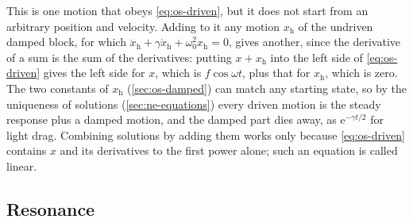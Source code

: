 This is one motion that obeys \cref{eq:os-driven}, but it does not start
from an arbitrary position and velocity. Adding to it any motion $x_{\mathrm
h}$ of the undriven damped block, for which $\ddot{x}_{\mathrm h} + \gamma
\dot{x}_{\mathrm h} + \omega_0^2x_{\mathrm h} = 0$, gives another, since
the derivative of a sum is the sum of the derivatives: putting $x +
x_{\mathrm h}$ into the left side of \cref{eq:os-driven} gives the left
side for $x$, which is $f\cos\omega t$, plus that for $x_{\mathrm h}$,
which is zero. The two constants of $x_{\mathrm h}$ (\cref{sec:os-damped})
can match any starting state, so by the uniqueness of solutions
(\cref{sec:ne-equations}) every driven motion is the steady response plus
a damped motion, and the damped part dies away, as $\mathrm{e}^{-\gamma
t/2}$ for light drag.
Combining solutions by adding them works only because \cref{eq:os-driven}
contains $x$ and its derivatives to the first power alone; such an
equation is called linear.

\subsection*{Resonance}

